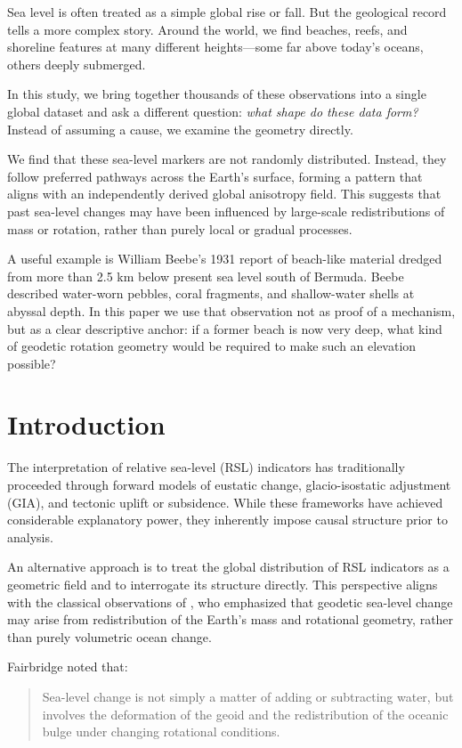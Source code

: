 \documentclass[twocolumn,10pt]{article}
\begin{document}
Sea level is often treated as a simple global rise or fall. But the geological record tells a more complex story. Around the world, we find beaches, reefs, and shoreline features at many different heights---some far above today's oceans, others deeply submerged. 

In this study, we bring together thousands of these observations into a single global dataset and ask a different question: \emph{what shape do these data form?} Instead of assuming a cause, we examine the geometry directly.

We find that these sea-level markers are not randomly distributed. Instead, they follow preferred pathways across the Earth’s surface, forming a pattern that aligns with an independently derived global anisotropy field. This suggests that past sea-level changes may have been influenced by large-scale redistributions of mass or rotation, rather than purely local or gradual processes.

A useful example is William Beebe’s 1931 report of beach-like material dredged from more than 2.5 km below present sea level south of Bermuda. Beebe described water-worn pebbles, coral fragments, and shallow-water shells at abyssal depth. In this paper we use that observation not as proof of a mechanism, but as a clear descriptive anchor: if a former beach is now very deep, what kind of geodetic rotation geometry would be required to make such an elevation possible?

\section{Introduction}

The interpretation of relative sea-level (RSL) indicators has traditionally proceeded through forward models of eustatic change, glacio-isostatic adjustment (GIA), and tectonic uplift or subsidence. While these frameworks have achieved considerable explanatory power, they inherently impose causal structure prior to analysis.

An alternative approach is to treat the global distribution of RSL indicators as a geometric field and to interrogate its structure directly. This perspective aligns with the classical observations of \citet{fairbridge1961}, who emphasized that geodetic sea-level change may arise from redistribution of the Earth's mass and rotational geometry, rather than purely volumetric ocean change.

Fairbridge noted that:
\begin{quote}
Sea-level change is not simply a matter of adding or subtracting water, but involves the deformation of the geoid and the redistribution of the oceanic bulge under changing rotational conditions.
\end{quote}
\end{document}
